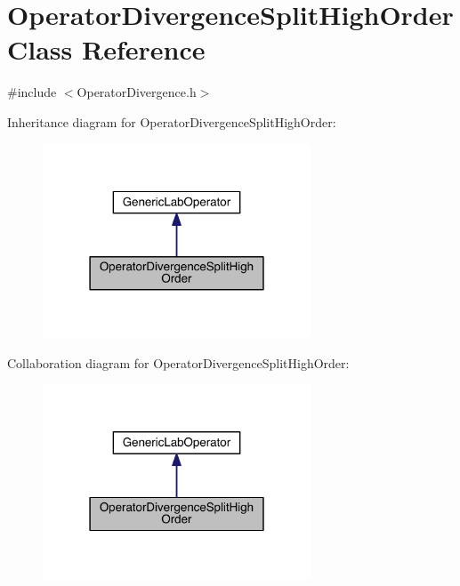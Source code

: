 \hypertarget{class_operator_divergence_split_high_order}{}\section{Operator\+Divergence\+Split\+High\+Order Class Reference}
\label{class_operator_divergence_split_high_order}


{\ttfamily \#include $<$Operator\+Divergence.\+h$>$}



Inheritance diagram for Operator\+Divergence\+Split\+High\+Order\+:\nopagebreak
\begin{figure}[H]
\begin{center}
\leavevmode
\includegraphics[width=226pt]{d9/dea/class_operator_divergence_split_high_order__inherit__graph}
\end{center}
\end{figure}


Collaboration diagram for Operator\+Divergence\+Split\+High\+Order\+:\nopagebreak
\begin{figure}[H]
\begin{center}
\leavevmode
\includegraphics[width=226pt]{dc/d83/class_operator_divergence_split_high_order__coll__graph}
\end{center}
\end{figure}
